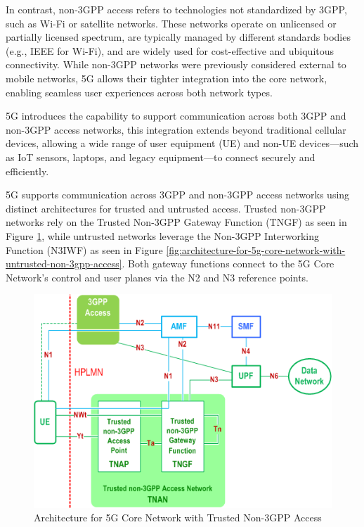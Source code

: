 In contrast, non-\ac{3GPP} access refers to technologies not standardized by \ac{3GPP}, such as Wi-Fi or satellite networks. These networks operate on unlicensed or partially licensed spectrum, are typically managed by different standards bodies (e.g., IEEE for Wi-Fi), and are widely used for cost-effective and ubiquitous connectivity. While non-\ac{3GPP} networks were previously considered external to mobile networks, 5G allows their tighter integration into the core network, enabling seamless user experiences across both network types. %

5G introduces the capability to support communication across both \ac{3GPP} and non-\ac{3GPP} access networks, this integration extends beyond traditional cellular devices, allowing a wide range of user equipment (UE) and non-UE devices—such as IoT sensors, laptops, and legacy equipment—to connect securely and efficiently.

5G supports communication across \ac{3GPP} and non-\ac{3GPP} access networks using distinct architectures for trusted and untrusted access. Trusted non-\ac{3GPP} networks rely on the Trusted Non-\ac{3GPP} Gateway Function (TNGF) as seen in Figure \ref{fig:architecture-for-5g-core-network-with-trusted-non-3gpp-access}, while untrusted networks leverage the Non-\ac{3GPP} Interworking Function (N3IWF) as seen in Figure \ref{fig:architecture-for-5g-core-network-with-untrusted-non-3gpp-access}. Both gateway functions connect to the 5G Core Network’s control and user planes via the N2 and N3 reference points.

\begin{figure}
    \centering
    \includegraphics[width=0.5\linewidth]{figs/architecture-for-5g-core-network-with-trusted-non-3gpp-access.png}
    \caption{Architecture for 5G Core Network with Trusted Non-3GPP Access}
    \label{fig:architecture-for-5g-core-network-with-trusted-non-3gpp-access}
\end{figure}

